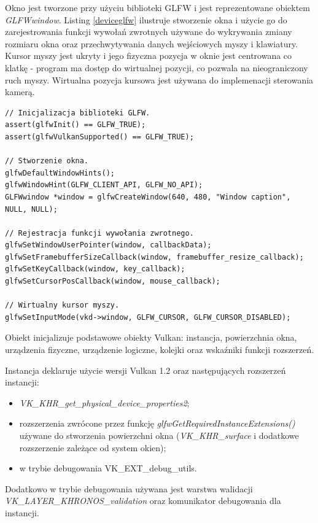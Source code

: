 Okno jest tworzone przy użyciu biblioteki GLFW i jest reprezentowane obiektem \textit{GLFWwindow}.
Listing \ref{deviceglfw} ilustruje stworzenie okna i użycie go do zarejestrowania funkcji wywołań zwrotnych używane do wykrywania zmiany rozmiaru okna oraz przechwytywania danych wejściowych myszy i klawiatury.
Kursor myszy jest ukryty i jego fizyczna pozycja w oknie jest
centrowana co klatkę - program ma dostęp do wirtualnej pozycji, co pozwala na nieograniczony ruch myszy.
Wirtualna pozycja kursowa jest używana do implemenacji sterowania kamerą.
\lstset{language=C}
\begin{lstlisting}[caption={Użycie biblioteki GLFW do stworzenia okna i rejestracji funkcji wywołań zwrotnich},captionpos=b,label={deviceglfw}]
// Inicjalizacja biblioteki GLFW.
assert(glfwInit() == GLFW_TRUE);
assert(glfwVulkanSupported() == GLFW_TRUE);

// Stworzenie okna.
glfwDefaultWindowHints();
glfwWindowHint(GLFW_CLIENT_API, GLFW_NO_API);
GLFWwindow *window = glfwCreateWindow(640, 480, "Window caption", NULL, NULL);

// Rejestracja funkcji wywołania zwrotnego.
glfwSetWindowUserPointer(window, callbackData);
glfwSetFramebufferSizeCallback(window, framebuffer_resize_callback);
glfwSetKeyCallback(window, key_callback);
glfwSetCursorPosCallback(window, mouse_callback);

// Wirtualny kursor myszy.
glfwSetInputMode(vkd->window, GLFW_CURSOR, GLFW_CURSOR_DISABLED);
\end{lstlisting}

Obiekt inicjalizuje podstawowe obiekty Vulkan: instancja, powierzchnia okna, urządzenia fizyczne, urządzenie logiczne, kolejki oraz wskaźniki funkcji rozszerzeń.

Instancja deklaruje użycie wersji Vulkan 1.2 oraz następujących rozszerzeń instancji:
\begin{itemize}
	\item \textit{VK\_KHR\_get\_physical\_device\_properties2};
	\item rozszerzenia zwrócone przez funkcję \textit{glfwGetRequiredInstanceExtensions()} używane do stworzenia powierzchni okna (\textit{VK\_KHR\_surface} i dodatkowe rozszerzenie zależące od system okien);
	\item w trybie debugowania VK\_EXT\_debug\_utils.
\end{itemize}
Dodatkowo w trybie debugowania używana jest warstwa walidacji \textit{VK\_LAYER\_KHRONOS\_validation} oraz komunikator debugowania dla instancji.

